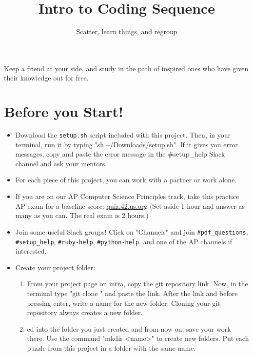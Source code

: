\documentclass{42-en}
\begin{document}
\title{Intro to Coding Sequence}
\subtitle{Scatter, learn things, and regroup}


\summary
{
	Keep a friend at your side, and study in the path of inspired ones who have given their knowledge out for free. 
}

\maketitle

\tableofcontents


\chapter{Before you Start!}

\begin{itemize}

	\item Download the \texttt{setup.sh} script included with this project. Then, in your terminal, run it by typing "sh \textasciitilde/Downloads/setup.sh". If it gives you error messages, copy and paste the error message in the \#setup\_help Slack channel and ask your mentors.
	\item For each piece of this project, you can work with a partner or work alone.
	\item If you are on our AP Computer Science Principles track, take this practice AP exam for a baseline score: \url{quiz.42.us.org} (Set aside 1 hour and answer as many as you can. The real exam is 2 hours.)
	\item Join some useful Slack groups! Click on "Channels" and join \texttt{\#pdf\_questions}, \texttt{\#setup\_help}, \texttt{\#ruby-help}, \texttt{\#python-help}, and one of the AP channels if interested.
	\item Create your project folder:
	\begin{enumerate}
		\item From your project page on intra, copy the git repository link. Now, in the terminal type "git clone " and paste the link. After the link and before pressing enter, write a name for the new folder. Cloning your git repository always creates a new folder.
		\item cd into the folder you just created and from now on, save your work there. Use the command "mkdir <name>" to create new folders. Put each puzzle from this project in a folder with the same name.
	\end{enumerate}
\end{itemize}
\end{document}
